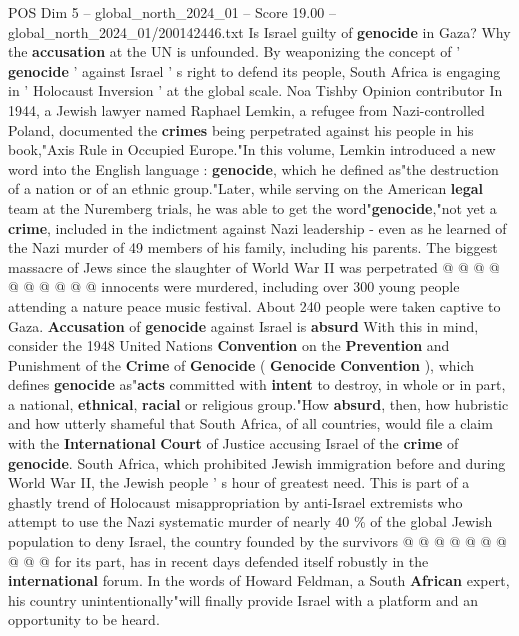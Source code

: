 \begin{textsample}{POS Dim 5 – global\_north\_2024\_01 – Score 19.00 – global\_north\_2024\_01/200142446.txt}  \label{ex:f5_pos_118}
Is Israel guilty of \textbf{genocide} in Gaza?
Why the \textbf{accusation} at the UN is unfounded.
By weaponizing the concept of ' \textbf{genocide} ' against Israel ' s right to defend its people, South Africa is engaging in ' Holocaust Inversion ' at the global scale.
Noa Tishby Opinion contributor In 1944, a Jewish lawyer named Raphael Lemkin, a refugee from Nazi-controlled Poland, documented the \textbf{crimes} being perpetrated against his people in his book,"Axis Rule in Occupied Europe."In this volume, Lemkin introduced a new word into the English language : \textbf{genocide}, which he defined as"the destruction of a nation or of an ethnic group."Later, while serving on the American \textbf{legal} team at the Nuremberg trials, he was able to get the word"\textbf{genocide},"not yet a \textbf{crime}, included in the indictment against Nazi leadership - even as he learned of the Nazi murder of 49 members of his family, including his parents.
The biggest massacre of Jews since the slaughter of World War II was perpetrated @ @ @ @ @ @ @ @ @ @ innocents were murdered, including over 300 young people attending a nature peace music festival.
About 240 people were taken captive to Gaza. \textbf{Accusation} of \textbf{genocide} against Israel is \textbf{absurd} With this in mind, consider the 1948 United Nations \textbf{Convention} on the \textbf{Prevention} and Punishment of the \textbf{Crime} of \textbf{Genocide} ( \textbf{Genocide} \textbf{Convention} ), which defines \textbf{genocide} as"\textbf{acts} committed with \textbf{intent} to destroy, in whole or in part, a national, \textbf{ethnical}, \textbf{racial} or religious group."How \textbf{absurd}, then, how hubristic and how utterly shameful that South Africa, of all countries, would file a claim with the \textbf{International} \textbf{Court} of Justice accusing Israel of the \textbf{crime} of \textbf{genocide}.
South Africa, which prohibited Jewish immigration before and during World War II, the Jewish people ' s hour of greatest need.
This is part of a ghastly trend of Holocaust misappropriation by anti-Israel extremists who attempt to use the Nazi systematic murder of nearly 40 \% of the global Jewish population to deny Israel, the country founded by the survivors @ @ @ @ @ @ @ @ @ @ for its part, has in recent days defended itself robustly in the \textbf{international} forum.
In the words of Howard Feldman, a South \textbf{African} expert, his country unintentionally"will finally provide Israel with a platform and an opportunity to be heard.

\end{textsample}
